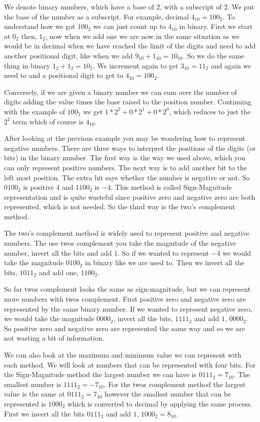 We denote binary numbers, which have a base of $2$, with a subscript of $2$. We put the base of the number as a subscript. For example, decimal $4_{10} = {100}_2$. To understand how we got ${100}_2$ we can just count up to $4_{10}$ in binary. First we start at $0_{2}$ then, $1_2$, now when we add one we are now in the same situation as we would be in decimal when we have reached the limit of the digits and need to add another positional digit, like when we add $9_{10} + 1_{10} = 10_{10}$. So we do the same thing in binary $1_2 + 1_2 = 10_2$. We increment again to get $3_{10} = 11_2$ and again we need to and a positional digit to get to $4_{10} = 100_2$.

Conversely, if we are given a binary number we can sum over the number of digits adding the value times the base raised to the position number. Continuing with the example of $100_2$ we get $1*2^2 + 0*2^1 + 0*2^0$, which reduces to just the $2^2$ term which of course is $4_{10}$.
	
After looking at the previous example you may be wondering how to represent negative numbers. There are three ways to interpret the positions of the digits (or bits) in the binary number. The first way is the way we used above, which you can only represent positive numbers. The next way is to add another bit to the left most position. The extra bit says whether the number is negative or not. So $0100_2$ is positive $4$ and $1100_2$ is $-4$. This method is called Sign-Magnitude representation and is quite wasteful since positive zero and negative zero are both represented, which is not needed. So the third way is the two's complement method.	
	
The two's complement method is widely used to represent positive and negative numbers. The use twos complement you take the magnitude of the negative number, invert all the bits and add $1$. So if we wanted to represent $-4$ we would take the magnitude $0100_2$ in binary like we are used to. Then we invert all the bits, $1011_2$ and add one, $1100_2$.	
	
So far twos complement looks the same as sign-magnitude, but we can represent more numbers with twos complement. First positive zero and negative zero are represented by the same binary number. If we wanted to represent negative zero, we would take the magnitude $0000_2$, invert all the bits, $1111_2$ and add $1$, $0000_2$. So positive zero and negative zero are represented the same way and so we are not wasting a bit of information.
	
We can also look at the maximum and minimum value we can represent with each method. We will look at numbers that can be represented with four bits. For the Sign-Magnitude method the largest number we can have is $0111_2 = 7_{10}$. The smallest number is $1111_2 = -7_{10}$. For the twos complement method the largest value is the same at $0111_2 = 7_{10}$ however the smallest number that can be represented is $1000_2$ which is converted to decimal by applying the same process. First we invert all the bits $0111_2$ and add $1$, $1000_2 = 8_{10}$.
	

